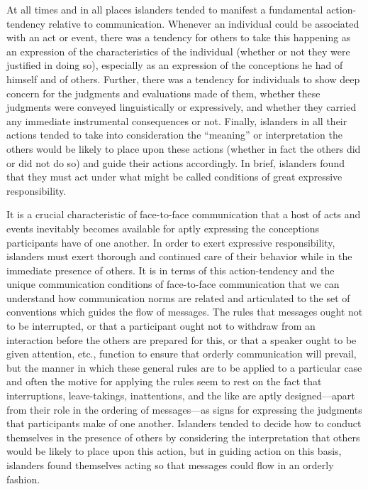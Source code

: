 \documentclass[twoside,symmetric,nobib,justified]{tufte-book}
\begin{document}
\enlargethispage{\baselineskip}

At all times and in all places islanders tended to manifest a
fundamental action-tendency relative to communication. Whenever an
individual could be associated with an act or event, there was a
tendency for others to take this happening as an expression of the
characteristics of the individual (whether or not they were justified in
doing so), especially as an expression of the conceptions he had of
himself and of others. Further, there was a tendency for individuals to
show deep concern for the judgments and evaluations made of them,
whether these judgments were conveyed linguistically or expressively,
and whether they carried any immediate instrumental consequences or not.
Finally, islanders in all their actions tended to take into
consideration the ``meaning'' or interpretation the others would be
likely to place upon these actions (whether in fact the others did or
did not do so) and guide their actions accordingly. In brief, islanders
found that they must act under what might be called conditions of great
expressive responsibility.

It is a crucial characteristic of face-to-face communication that a host
of acts and events inevitably becomes available for aptly expressing the
conceptions participants have of one another. In order to exert
expressive responsibility, islanders must exert thorough and continued
care of their behavior while in the immediate presence of others. It is
in terms of this action-tendency and the unique communication conditions
of face-to-face communication that we can understand how communication
norms are related and articulated to the set of conventions which guides
the flow of messages. The rules that messages ought not to be
interrupted, or that a participant ought not to withdraw from an
interaction before the others are prepared for this, or that a speaker
ought to be given attention, etc., function to ensure that orderly
communication will prevail, but the manner in which these general rules
are to be applied to a particular case and often the motive for applying
the rules seem to rest on the fact that interruptions, leave-takings,
inattentions, and the like are aptly designed---apart from their role in
the ordering of messages---as signs for expressing the judgments that
participants make of one another. Islanders tended to decide how to
conduct themselves in the presence of others by considering the
interpretation that others would be likely to place upon this action,
but in guiding action on this basis, islanders found themselves acting
so that messages could flow in an orderly fashion.
\end{document}
